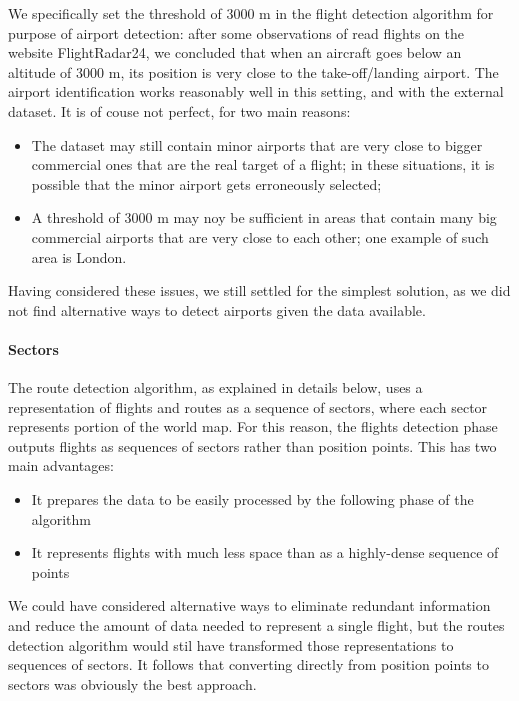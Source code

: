 \documentclass{vldb}
\begin{document}
We specifically set the threshold of 3000 m in the flight detection algorithm
for purpose of airport detection: after some observations of read flights on the
website FlightRadar24, we concluded that when an aircraft goes below an altitude
of 3000 m, its position is very close to the take-off/landing airport. The
airport identification works reasonably well in this setting, and with the
external dataset. It is of couse not perfect, for two main reasons:

\begin{itemize}
  \item The dataset may still contain minor airports that are very close to
  bigger commercial ones that are the real target of a flight; in these
  situations, it is possible that the minor airport gets erroneously selected;
  \item A threshold of 3000 m may noy be sufficient in areas that contain many
  big commercial airports that are very close to each other; one example of such
  area is London.
\end{itemize}

Having considered these issues, we still settled for the simplest solution, as
we did not find alternative ways to detect airports given the data available.

\paragraph{Sectors}

The route detection algorithm, as explained in details below, uses a
representation of flights and routes as a sequence of sectors, where each sector
represents portion of the world map. For this reason, the flights detection
phase outputs flights as sequences of sectors rather than position points. This
has two main advantages:

\begin{itemize}
  \item It prepares the data to be easily processed by the following phase of
  the algorithm
  \item It represents flights with much less space than as a highly-dense
  sequence of points
\end{itemize}

We could have considered alternative ways to eliminate redundant information and
reduce the amount of data needed to represent a single flight, but the routes
detection algorithm would stil have transformed those representations to
sequences of sectors. It follows that converting directly from position points
to sectors was obviously the best approach.
\end{document}
